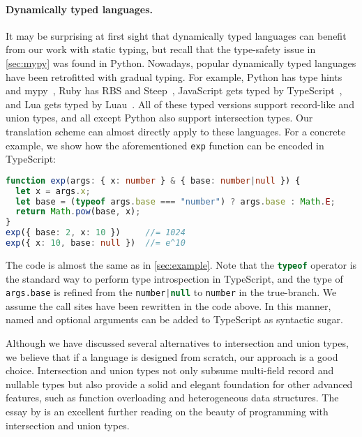 \paragraph{Dynamically typed languages.}
It may be surprising at first sight that dynamically typed languages can benefit
from our work with static typing, but recall that the type-safety issue in
\autoref{sec:mypy} was found in Python. Nowadays, popular dynamically typed
languages have been retrofitted with gradual typing. For example, Python has
type hints and mypy~\citep{mypy}, Ruby has RBS and Steep~\citep{steep},
JavaScript gets typed by TypeScript~\citep{typescript}, and Lua gets typed by
Luau~\citep{luau}. All of these typed versions support record-like and union
types, and all except Python also support intersection types. Our translation
scheme can almost directly apply to these languages. For a concrete example, we
show how the aforementioned \lstinline{exp} function can be encoded in
TypeScript:
\begin{lstlisting}[language=TypeScript]
function exp(args: { x: number } & { base: number|null }) {
  let x = args.x;
  let base = (typeof args.base === "number") ? args.base : Math.E;
  return Math.pow(base, x);
}
exp({ base: 2, x: 10 })     //= 1024
exp({ x: 10, base: null })  //= e^10
\end{lstlisting}
The code is almost the same as in \autoref{sec:example}. Note that the
\lstinline[language=TypeScript]{typeof} operator is the standard way to perform
type introspection in TypeScript, and the type of \lstinline{args.base} is
refined from the \lstinline[language=TypeScript]{number|null} to
\lstinline[language=TypeScript]{number} in the true-branch. We assume the call
sites have been rewritten in the code above. In this manner, named and optional
arguments can be added to TypeScript as syntactic sugar.

Although we have discussed several alternatives to intersection and union types,
we believe that if a language is designed from scratch, our approach is a good
choice. Intersection and union types not only subsume multi-field record and
nullable types but also provide a solid and elegant foundation for other
advanced features, such as function overloading and heterogeneous data
structures. The essay by \citet{castagna2023programming} is an excellent further
reading on the beauty of programming with intersection and union types.
